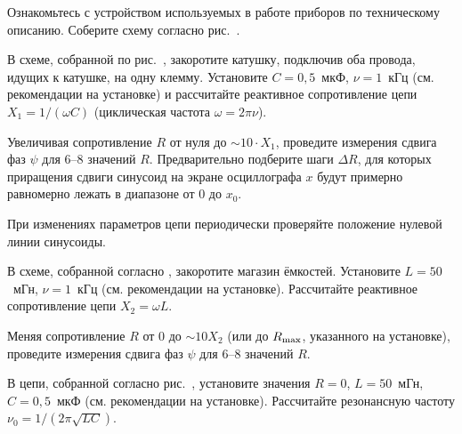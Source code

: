 \begin{lab:task}


\item Ознакомьтесь с устройством используемых в работе приборов по техническому
описанию. Соберите схему согласно рис.~.

\item В схеме, собранной по рис.~, закоротите катушку, подключив оба провода, 
идущих к катушке, на одну клемму. Установите $C=0,5$~мкФ, $\nu=1$~кГц 
(см. рекомендации на установке) и 
рассчитайте реактивное сопротивление цепи $X_1=1/(\omega C)$
(циклическая частота $\omega=2\pi\nu$).

\item Увеличивая сопротивление $R$ от нуля до $\sim 10\cdot X_1$, проведите 
измерения сдвига фаз $\psi$ для 6--8 значений $R$.
Предварительно подберите шаги $\Delta R$, для которых приращения 
сдвиги синусоид на экране осциллографа $x$ будут примерно равномерно
лежать в диапазоне от 0 до $x_0$. 

При изменениях параметров цепи периодически проверяйте положение 
нулевой линии синусоиды.


\item В схеме, собранной согласно , закоротите магазин ёмкостей. 
Установите $L=50$~мГн, $\nu=1$~кГц (см. рекомендации на установке). 
Рассчитайте реактивное сопротивление цепи $X_2=\omega L$.

\item Меняя сопротивление $R$ от 0 до $\sim 10X_2$ 
(или до $R_{\rm max}$, указанного на установке), 
проведите измерения сдвига фаз $\psi$ для 6--8 значений $R$.


\item В цепи, собранной согласно рис.~, установите значения 
$R=0$, $L=50$~мГн, $C=0,5$~мкФ (см. рекомендации на установке). 
Рассчитайте резонансную частоту $\nu_0=1/(2\pi\sqrt{LC})$.
 

\end{lab:task}
